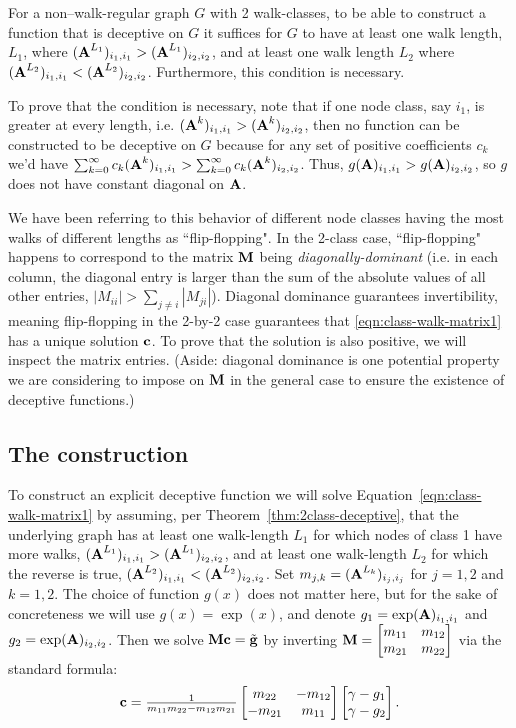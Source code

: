  \begin{theorem}\label{thm:2class-deceptive}
 For a non--walk-regular graph $G$ with 2 walk-classes, to be able to construct a function that is deceptive on $G$ it suffices for $G$ to have at least one walk length, $L_1$, where $(\textbf{A}^{L_1})_{i_1,i_1} > (\textbf{A}^{L_1})_{i_2,i_2}$, and at least one walk length $L_2$ where $(\textbf{A}^{L_2})_{i_1,i_1} < (\textbf{A}^{L_2})_{i_2,i_2}$. Furthermore, this condition is necessary.
  \end{theorem}

 To prove that the condition is necessary, note that if one node class, say $i_1$, is greater at every length, i.e. $(\textbf{A}^{k})_{i_1,i_1} > (\textbf{A}^{k})_{i_2,i_2}$, then no function can be constructed to be deceptive  on $G$ because for any set of positive coefficients $c_k$ we'd have $\sum_{k=0}^{\infty} c_k (\textbf{A}^{k})_{i_1,i_1} >  \sum_{k=0}^{\infty} c_k (\textbf{A}^{k})_{i_2,i_2}$. Thus, $g(\textbf{A})_{i_1,i_1} > g(\textbf{A})_{i_2,i_2}$, so $g$ does not have constant diagonal on $\textbf{A}$.

 We have been referring to this behavior of different node classes having the most walks of different lengths as ``flip-flopping". In the 2-class case, ``flip-flopping" happens to correspond to the matrix $\textbf{M}$ being \emph{diagonally-dominant} (i.e. in each column, the diagonal entry is larger than the sum of the absolute values of all other entries, $|M_{ii}| > \sum_{j\neq i} |M_{ji}|$). Diagonal dominance guarantees invertibility, meaning flip-flopping in the 2-by-2 case guarantees that \eqref{eqn:class-walk-matrix1} has a unique solution $\textbf{c}$. To prove that the solution is also positive, we will inspect the matrix entries. (Aside: diagonal dominance is one potential property we are considering to impose on $\textbf{M}$ in the general case to ensure the existence of deceptive functions.)

 \subsection{The construction}

 To construct an explicit deceptive function we will solve Equation~\eqref{eqn:class-walk-matrix1} by assuming, per Theorem~\ref{thm:2class-deceptive}, that the underlying graph has at least one walk-length $L_1$ for which nodes of class 1 have more walks, $(\textbf{A}^{L_1})_{i_1,i_1} > (\textbf{A}^{L_1})_{i_2,i_2}$, and at least one walk-length $L_2$ for which the reverse is true, $(\textbf{A}^{L_2})_{i_1,i_1} < (\textbf{A}^{L_2})_{i_2,i_2}$.
 Set $m_{j,k} = (\textbf{A}^{L_k})_{i_j,i_j}$ for $j=1,2$ and $k=1,2$. The choice of function $g(x)$ does not matter here, but for the sake of concreteness we will use $g(x) = \exp(x)$, and denote $g_1 = \exp(\textbf{A})_{i_1,i_1}$ and $g_2 = \exp(\textbf{A})_{i_2,i_2}$. Then we solve $\textbf{M} \textbf{c} = \tilde{\textbf{g}}$ by inverting $\textbf{M} = \begin{bmatrix} m_{11} & m_{12} \\ m_{21} & m_{22}  \end{bmatrix}$ via the standard formula:
 \[
 \textbf{c} = \tfrac{1}{m_{11}m_{22} - m_{12}m_{21}} \begin{bmatrix} m_{22} & -m_{12} \\ -m_{21} & m_{11} \end{bmatrix} \begin{bmatrix} \gamma - g_1 \\ \gamma - g_2 \end{bmatrix}.
 \]

